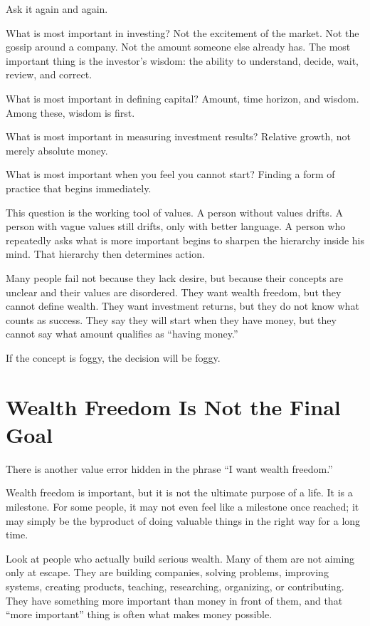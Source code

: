 Ask it again and again.

What is most important in investing? Not the excitement of the market. Not the gossip around a company. Not the amount someone else already has. The most important thing is the investor's wisdom: the ability to understand, decide, wait, review, and correct.

What is most important in defining capital? Amount, time horizon, and wisdom. Among these, wisdom is first.

What is most important in measuring investment results? Relative growth, not merely absolute money.

What is most important when you feel you cannot start? Finding a form of practice that begins immediately.

This question is the working tool of values. A person without values drifts. A person with vague values still drifts, only with better language. A person who repeatedly asks what is more important begins to sharpen the hierarchy inside his mind. That hierarchy then determines action.

Many people fail not because they lack desire, but because their concepts are unclear and their values are disordered. They want wealth freedom, but they cannot define wealth. They want investment returns, but they do not know what counts as success. They say they will start when they have money, but they cannot say what amount qualifies as ``having money.''

If the concept is foggy, the decision will be foggy.

\section*{Wealth Freedom Is Not the Final Goal}

There is another value error hidden in the phrase ``I want wealth freedom.''

Wealth freedom is important, but it is not the ultimate purpose of a life. It is a milestone. For some people, it may not even feel like a milestone once reached; it may simply be the byproduct of doing valuable things in the right way for a long time.

Look at people who actually build serious wealth. Many of them are not aiming only at escape. They are building companies, solving problems, improving systems, creating products, teaching, researching, organizing, or contributing. They have something more important than money in front of them, and that ``more important'' thing is often what makes money possible.


